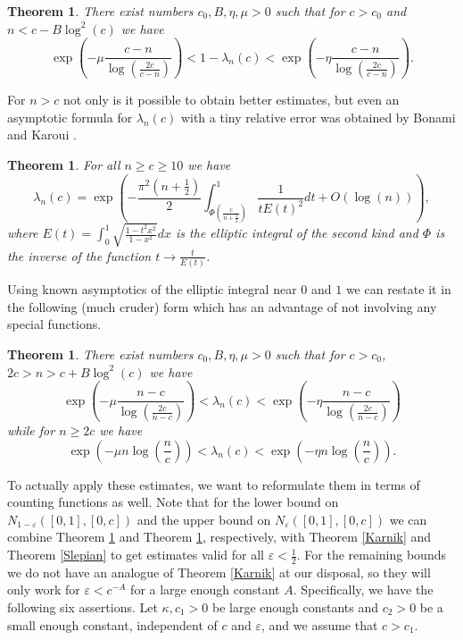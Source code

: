 \documentclass[12pt]{amsart}
\numberwithin{equation}{section}
\newcommand{\eps}{\varepsilon}
\newtheorem{theorem}[Thm]{Theorem}
\begin{document}
\begin{theorem}\label{Nazarov}
There exist numbers $c_0,B, \eta, \mu > 0$ such that for $c > c_0$ and $n < c-B\log^2(c)$ we have
\begin{equation}\label{Nazarov equation}    
\exp\left(-\mu\frac{c-n}{\log(\frac{2c}{c-n})}\right) < 1-\lambda_n(c) <\exp\left(-\eta\frac{c-n}{\log(\frac{2c}{c-n})}\right).
\end{equation}
\end{theorem}

For $n > c$ not only is it possible to obtain better estimates, but even an asymptotic formula for $\lambda_n(c)$ with a tiny relative error was obtained by Bonami and Karoui \cite{Bonami_Karoui_17}.
\begin{theorem}
For all $n \ge c \ge 10$ we have
$$\lambda_n(c) = \exp\left(-\frac{\pi^2\left(n+\frac{1}{2}\right)}{2} \int_{\Phi\left(\frac{c}{n+\frac{1}{2}}\right)}^1 \frac{1}{tE(t)^2}dt+O(\log(n))\right),$$
where $E(t) = \int_0^1 \sqrt{\frac{1-t^2x^2}{1-x^2}}dx$ is the elliptic integral of the second kind and $\Phi$ is the inverse of the function $t\to \frac{t}{E(t)}$. 	
\end{theorem}

Using known asymptotics of the elliptic integral near $0$ and $1$ we can restate it in the following (much cruder) form which has an advantage of not involving any special functions.
\begin{theorem}\label{Bonami2}
There exist numbers $c_0,B, \eta, \mu > 0$ such that for $c > c_0$, $2c > n > c+B\log^2(c)$ we have
$$\exp\left(-\mu\frac{n-c}{\log(\frac{2c}{n-c})}\right) < \lambda_n(c) <\exp\left(-\eta\frac{n-c}{\log(\frac{2c}{n-c})}\right)$$
while for $n \ge 2c$ we have
$$\exp\left(-\mu n \log\left(\frac{n}{c}\right)\right) < \lambda_n(c) < \exp\left(-\eta n \log\left(\frac{n}{c}\right)\right).$$	
\end{theorem}

To actually apply these estimates, we want to reformulate them in terms of counting functions as well. Note that for the lower bound on $N_{1-\eps}([0,1],[0,c])$ and the upper bound on $N_{\eps}([0,1],[0,c])$ we can combine Theorem \ref{Nazarov} and Theorem \ref{Bonami2}, respectively, with Theorem \ref{Karnik} and Theorem \ref{Slepian} to get estimates valid for all $\eps < \frac{1}{2}$. For the remaining bounds we do not have an analogue of Theorem \ref{Karnik} at our disposal, so they will only work for $\eps < c^{-A}$ for a large enough constant $A$. Specifically, we have the following six assertions. Let $\kappa, c_1 > 0$ be large enough constants and $c_2 > 0$ be a small enough constant, independent of $c$ and $\eps$, and we assume that $c > c_1$. 
\end{document}
